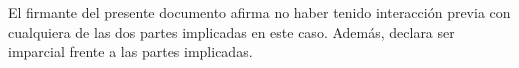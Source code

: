 El firmante del presente documento afirma no haber tenido interacción previa con cualquiera de las dos partes implicadas en este caso.
Además, declara ser imparcial frente a las partes implicadas.

